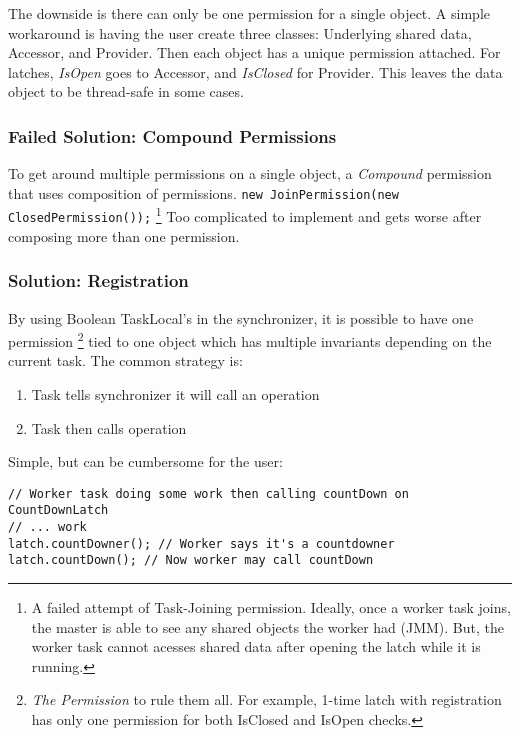 \documentclass[9pt, twoside, a4paper]{article}
\begin{document}
    The downside is there can only be one permission for a single object. A simple workaround is having the \gls{user} create
    three classes: Underlying shared data, Accessor, and Provider. Then each object has a unique permission attached.
    For latches, \textit{IsOpen} goes to Accessor, and \textit{IsClosed} for Provider. This leaves the data object to
    be thread-safe in some cases.


    \subsubsection*{Failed Solution: Compound Permissions}
    To get around multiple permissions on a single object, a \textit{Compound} permission that uses
    composition of permissions. \lstinline{new JoinPermission(new ClosedPermission());}
    \footnote{A failed attempt of Task-Joining permission. Ideally, once a worker task joins, the master is able
    to see any shared objects the worker had (JMM). But, the worker task cannot acesses shared data after opening
    the latch while it is running.}
    Too complicated to implement and gets worse after composing more than one permission.

    \subsubsection*{Solution: Registration}
    By using Boolean TaskLocal's in the synchronizer, it is possible to have one permission \footnote{
    \textit{The Permission} to rule them all. For example, 1-time latch with registration has only
    one permission for both IsClosed and IsOpen checks.
    } tied to one object which has multiple invariants depending on the current task. The common strategy
    is:
    \begin{enumerate}
        \item Task tells synchronizer it will call an operation
        \item Task then calls operation
    \end{enumerate}

    Simple, but can be cumbersome for the \gls{user}:
    \begin{lstlisting}
// Worker task doing some work then calling countDown on CountDownLatch
// ... work
latch.countDowner(); // Worker says it's a countdowner
latch.countDown(); // Now worker may call countDown
    \end{lstlisting}
\end{document}
